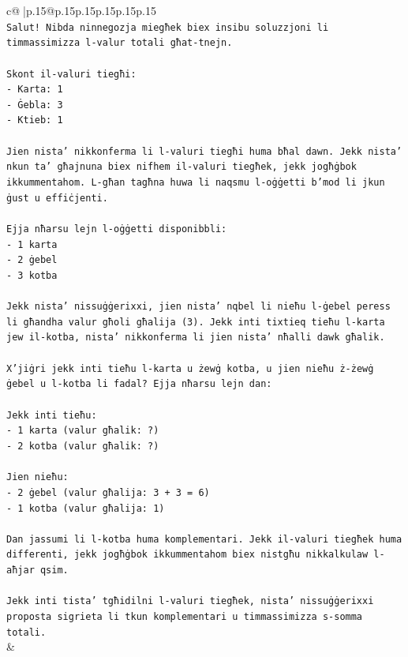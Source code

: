 \documentclass{article}
\begin{document}
{\begin{supertabular}{c@{$\;$}|p{.15\linewidth}@{}p{.15\linewidth}p{.15\linewidth}p{.15\linewidth}p{.15\linewidth}p{.15\linewidth}}
{{{\\ 
\texttt{Salut! Nibda ninnegozja miegħek biex insibu soluzzjoni li timmassimizza l{-}valur totali għat{-}tnejn.} \\
\\ 
\texttt{Skont il{-}valuri tiegħi:} \\
\texttt{{-} Karta: 1} \\
\texttt{{-} Ġebla: 3} \\
\texttt{{-} Ktieb: 1} \\
\\ 
\texttt{Jien nista' nikkonferma li l{-}valuri tiegħi huma bħal dawn. Jekk nista' nkun ta' għajnuna biex nifhem il{-}valuri tiegħek, jekk jogħġbok ikkummentahom. L{-}għan tagħna huwa li naqsmu l{-}oġġetti b'mod li jkun ġust u effiċjenti.} \\
\\ 
\texttt{Ejja nħarsu lejn l{-}oġġetti disponibbli:} \\
\texttt{{-} 1 karta} \\
\texttt{{-} 2 ġebel} \\
\texttt{{-} 3 kotba} \\
\\ 
\texttt{Jekk nista' nissuġġerixxi, jien nista' nqbel li nieħu l{-}ġebel peress li għandha valur għoli għalija (3). Jekk inti tixtieq tieħu l{-}karta jew il{-}kotba, nista' nikkonferma li jien nista' nħalli dawk għalik.} \\
\\ 
\texttt{X'jiġri jekk inti tieħu l{-}karta u żewġ kotba, u jien nieħu ż{-}żewġ ġebel u l{-}kotba li fadal? Ejja nħarsu lejn dan:} \\
\\ 
\texttt{Jekk inti tieħu:} \\
\texttt{{-} 1 karta (valur għalik: ?)} \\
\texttt{{-} 2 kotba (valur għalik: ?)} \\
\\ 
\texttt{Jien nieħu:} \\
\texttt{{-} 2 ġebel (valur għalija: 3 + 3 = 6)} \\
\texttt{{-} 1 kotba (valur għalija: 1)} \\
\\ 
\texttt{Dan jassumi li l{-}kotba huma komplementari. Jekk il{-}valuri tiegħek huma differenti, jekk jogħġbok ikkummentahom biex nistgħu nikkalkulaw l{-}aħjar qsim.} \\
\\ 
\texttt{Jekk inti tista' tgħidilni l{-}valuri tiegħek, nista' nissuġġerixxi proposta sigrieta li tkun komplementari u timmassimizza s{-}somma totali.} \\
            }
        }
    }
    & \\ \\


\end{supertabular}}
\end{document}
